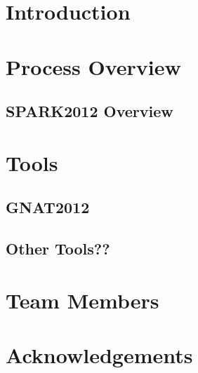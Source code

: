 \documentclass{report}
\begin{document}
\chapter{Introduction}


\chapter{Process Overview}




\section{SPARK2012 Overview}


\chapter{Tools}
\section{GNAT2012}


\section{Other Tools??}

\chapter{Team Members}


\chapter{Acknowledgements}

\end{document}
